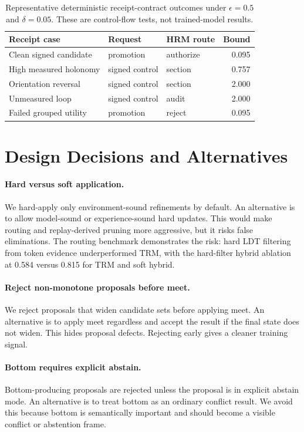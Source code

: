 \documentclass[11pt]{article}
\begin{document}
\begin{table}[t]
\centering
\small
\begin{tabular}{lllr}
\toprule
Receipt case & Request & HRM route & Bound \\
\midrule
Clean signed candidate & promotion & authorize & 0.095 \\
High measured holonomy & signed control & section & 0.757 \\
Orientation reversal & signed control & section & 2.000 \\
Unmeasured loop & signed control & audit & 2.000 \\
Failed grouped utility & promotion & reject & 0.095 \\
\bottomrule
\end{tabular}
\caption{Representative deterministic receipt-contract outcomes under $\epsilon=0.5$ and $\delta=0.05$.
These are control-flow tests, not trained-model results.}
\label{tab:hrm-review}
\end{table}

\section{Design Decisions and Alternatives}

\paragraph{Hard versus soft application.}
We hard-apply only environment-sound refinements by default. An alternative is to allow model-sound or experience-sound hard updates. This would make routing and replay-derived pruning more aggressive, but it risks false eliminations. The routing benchmark demonstrates the risk: hard LDT filtering from token evidence underperformed TRM, with the hard-filter hybrid ablation at 0.584 versus 0.815 for TRM and soft hybrid.

\paragraph{Reject non-monotone proposals before meet.}
We reject proposals that widen candidate sets before applying meet. An alternative is to apply meet regardless and accept the result if the final state does not widen. This hides proposal defects. Rejecting early gives a cleaner training signal.

\paragraph{Bottom requires explicit abstain.}
Bottom-producing proposals are rejected unless the proposal is in explicit abstain mode. An alternative is to treat bottom as an ordinary conflict result. We avoid this because bottom is semantically important and should become a visible conflict or abstention frame.
\end{document}

